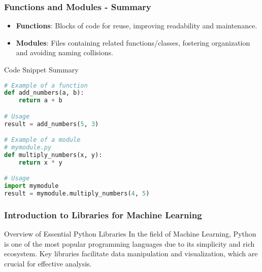 \documentclass{beamer}
\begin{document}
\begin{frame}[fragile]
    \frametitle{Functions and Modules - Summary}
    \begin{itemize}
        \item \textbf{Functions}: Blocks of code for reuse, improving readability and maintenance.
        \item \textbf{Modules}: Files containing related functions/classes, fostering organization and avoiding naming collisions.
    \end{itemize}

    \begin{block}{Code Snippet Summary}
    \begin{lstlisting}[language=Python]
# Example of a function
def add_numbers(a, b):
    return a + b

# Usage
result = add_numbers(5, 3)

# Example of a module
# mymodule.py
def multiply_numbers(x, y):
    return x * y

# Usage
import mymodule
result = mymodule.multiply_numbers(4, 5)
    \end{lstlisting}
    \end{block}
\end{frame}

\begin{frame}
    \frametitle{Introduction to Libraries for Machine Learning}
    \begin{block}{Overview of Essential Python Libraries}
        In the field of Machine Learning, Python is one of the most popular programming languages due to its simplicity and rich ecosystem. Key libraries facilitate data manipulation and visualization, which are crucial for effective analysis.
    \end{block}
\end{frame}
\end{document}
